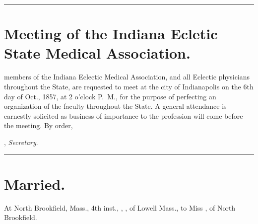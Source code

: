 \fancybreak{* * *}
\section*{Meeting of the Indiana Ecletic State Medical Association.}

 members of the Indiana Eclectic Medical Association, and all
Eclectic physicians throughout the State, are requested to meet at the
city of Indianapolis on the 6th day of Oct., 1857, at 2 o'clock P.~M.,
for the purpose of perfecting an organization of the faculty throughout
the State. A general attendance is earnestly solicited as business of importance
to the profession will come before the meeting. By order,

\hfill{}, \emph{Secretary}.

\fancybreak{* * *}
\section*{Married.}

\footnotesize
At North Brookfield, Mass., 4th inst., , \md, of Lowell Mass., to Miss
, of North Brookfield.
\normalsize
\clearpage
